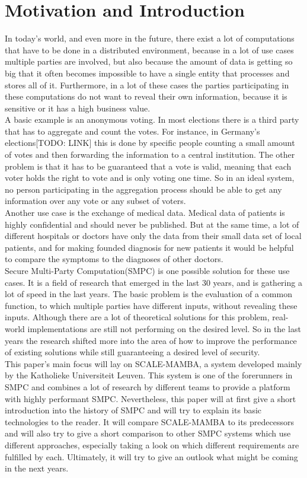 \documentclass[english,runningheads,a4paper]{llncs}[2018/03/10]
\begin{document}
\section{Motivation and Introduction}\label{sec:intromoti}
In today's world, and even more in the future, there exist a lot of computations that have to be done in a distributed environment, because in a lot of use cases multiple parties are involved, but also because the amount of data is getting so big that it often becomes impossible to have a single entity that processes and stores all of it. Furthermore, in a lot of these cases the parties participating in these computations do not want to reveal their own information, because it is sensitive or it has a high business value.\\
A basic example is an anonymous voting. In most elections there is a third party that has to aggregate and count the votes. For instance, in Germany's elections[TODO: LINK] this is done by specific people counting a small amount of votes and then forwarding the information to a central institution. The other problem is that it has to be guaranteed that a vote is valid, meaning that each voter holds the right to vote and is only voting one time. So in an ideal system, no person participating in the aggregation process should be able to get any information over any vote or any subset of voters.\\
Another use case is the exchange of medical data. Medical data of patients is highly confidential and should never be published. But at the same time, a lot of different hospitals or doctors have only the data from their small data set of local patients, and for making founded diagnosis for new patients it would be helpful to compare the symptoms to the diagnoses of other doctors.\\
Secure Multi-Party Computation(SMPC) is one possible solution for these use cases. It is a field of research that emerged in the last 30 years, and is gathering a lot of speed in the last years. 
The basic problem is the evaluation of a common function, to which multiple parties have different inputs, without revealing these inputs. Although there are a lot of theoretical solutions for this problem, real-world implementations are still not performing on the desired level. So in the last years the research shifted more into the area of how to improve the performance of existing solutions while still guaranteeing a desired level of security.\\
This paper's main focus will lay on SCALE-MAMBA, a system developed mainly by the Katholieke Universiteit Leuven. This system is one of the forerunners in SMPC and combines a lot of research by different teams to provide a platform with highly performant SMPC. Nevertheless, this paper will at first give a short introduction into the history of SMPC and will try to explain its basic technologies to the reader. It will compare SCALE-MAMBA to its predecessors and will also try to give a short comparison to other SMPC systems which use different approaches, especially taking a look on which different requirements are fulfilled by each. Ultimately, it will try to give an outlook what might be coming in the next years.\\
\end{document}
